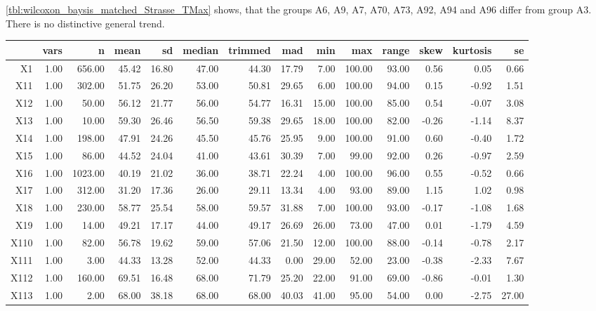 \cref{tbl:wilcoxon_baysis_matched_Strasse_TMax} shows, that the groups A6, A9, A7, A70, A73, A92, A94 and A96 differ from group A3. There is no distinctive general trend.
\begin{table}[ht!]
	\tiny
	\centering
  \begin{tabular}{rrrrrrrrrrrrrr}
    \hline
   & vars & n & mean & sd & median & trimmed & mad & min & max & range & skew & kurtosis & se \\ 
    \hline
  X1 & 1.00 & 656.00 & 45.42 & 16.80 & 47.00 & 44.30 & 17.79 & 7.00 & 100.00 & 93.00 & 0.56 & 0.05 & 0.66 \\ 
    X11 & 1.00 & 302.00 & 51.75 & 26.20 & 53.00 & 50.81 & 29.65 & 6.00 & 100.00 & 94.00 & 0.15 & -0.92 & 1.51 \\ 
    X12 & 1.00 & 50.00 & 56.12 & 21.77 & 56.00 & 54.77 & 16.31 & 15.00 & 100.00 & 85.00 & 0.54 & -0.07 & 3.08 \\ 
    X13 & 1.00 & 10.00 & 59.30 & 26.46 & 56.50 & 59.38 & 29.65 & 18.00 & 100.00 & 82.00 & -0.26 & -1.14 & 8.37 \\ 
    X14 & 1.00 & 198.00 & 47.91 & 24.26 & 45.50 & 45.76 & 25.95 & 9.00 & 100.00 & 91.00 & 0.60 & -0.40 & 1.72 \\ 
    X15 & 1.00 & 86.00 & 44.52 & 24.04 & 41.00 & 43.61 & 30.39 & 7.00 & 99.00 & 92.00 & 0.26 & -0.97 & 2.59 \\ 
    X16 & 1.00 & 1023.00 & 40.19 & 21.02 & 36.00 & 38.71 & 22.24 & 4.00 & 100.00 & 96.00 & 0.55 & -0.52 & 0.66 \\ 
    X17 & 1.00 & 312.00 & 31.20 & 17.36 & 26.00 & 29.11 & 13.34 & 4.00 & 93.00 & 89.00 & 1.15 & 1.02 & 0.98 \\ 
    X18 & 1.00 & 230.00 & 58.77 & 25.54 & 58.00 & 59.57 & 31.88 & 7.00 & 100.00 & 93.00 & -0.17 & -1.08 & 1.68 \\ 
    X19 & 1.00 & 14.00 & 49.21 & 17.17 & 44.00 & 49.17 & 26.69 & 26.00 & 73.00 & 47.00 & 0.01 & -1.79 & 4.59 \\ 
    X110 & 1.00 & 82.00 & 56.78 & 19.62 & 59.00 & 57.06 & 21.50 & 12.00 & 100.00 & 88.00 & -0.14 & -0.78 & 2.17 \\ 
    X111 & 1.00 & 3.00 & 44.33 & 13.28 & 52.00 & 44.33 & 0.00 & 29.00 & 52.00 & 23.00 & -0.38 & -2.33 & 7.67 \\ 
    X112 & 1.00 & 160.00 & 69.51 & 16.48 & 68.00 & 71.79 & 25.20 & 22.00 & 91.00 & 69.00 & -0.86 & -0.01 & 1.30 \\ 
    X113 & 1.00 & 2.00 & 68.00 & 38.18 & 68.00 & 68.00 & 40.03 & 41.00 & 95.00 & 54.00 & 0.00 & -2.75 & 27.00 \\ 

\end{tabular}
\end{table}
